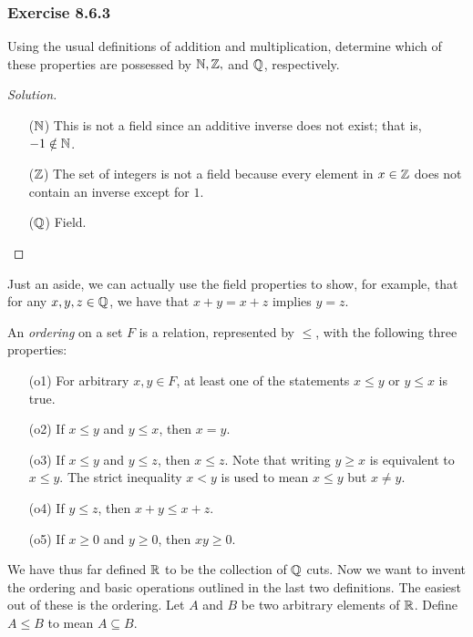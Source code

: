 \subsubsection{Exercise 8.6.3}  Using the usual definitions of addition and multiplication, determine which of these properties are possessed by \( \mathbb{N}  , \mathbb{Z},  \) and \( \mathbb{Q}  \), respectively.
\begin{proof}[Solution]
\begin{enumerate}
    \item[(\( \mathbb{N}  \))] This is not a field since an additive inverse does not exist; that is, \( - 1 \notin \mathbb{N} \). 
    \item[(\( \mathbb{Z}  \))] The set of integers is not a field because every element in \( x \in \mathbb{Z}  \) does not contain an inverse except for \(  1  \).
    \item[(\( \mathbb{Q} \))] Field.
\end{enumerate}
\end{proof}
 
Just an aside, we can actually use the field properties to show, for example, that for any \( x ,y , z  \in \mathbb{Q}  \), we have that \( x + y = x + z  \) implies \( y = z  \).

\begin{definition}[Ordering]
    An \textit{ordering} on a set \( F  \) is a relation, represented by \(  \leq  \), with the following three properties:
    \begin{enumerate}
        \item[(o1)] For arbitrary \( x,y \in F  \), at least one of the statements \( x \leq y  \) or \(  y \leq x  \) is true.
        \item[(o2)] If \( x \leq y  \) and \( y \leq x  \), then \( x = y  \).
        \item[(o3)] If \( x \leq y  \) and \( y \leq z  \), then \(  x \leq z  \).
        Note that writing \(  y \geq x  \) is equivalent to \( x \leq y  \). The strict inequality \( x < y  \) is used to mean \( x \leq y  \) but \( x \neq y  \).
        \item[(o4)] If \( y \leq z  \), then \( x + y \leq x + z  \).
        \item[(o5)] If \( x \geq 0  \) and \( y \geq 0  \), then \( xy \geq 0  \).
    \end{enumerate}
\end{definition}

We have thus far defined \( \mathbb{R}  \) to be the collection of \( \mathbb{Q}  \) cuts. Now we want to invent the ordering and basic operations outlined in the last two definitions. The easiest out of these is the ordering. Let \( A  \) and \(  B \) be two arbitrary elements of \( \mathbb{R}  \). Define \( A \leq B  \) to mean \( A \subseteq B  \).

